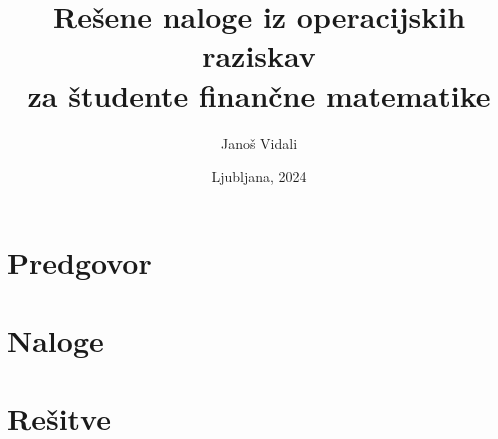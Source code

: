 \documentclass[a4paper, 11pt, titlepage, twoside]{article}
\begin{document}
\title{Rešene naloge iz operacijskih raziskav \\
{\Large za študente finančne matematike}}
\author{\Large Janoš Vidali}
\date{\vfill Ljubljana, 2024}
\maketitle

\cleardoublepage

\setcounter{tocdepth}{2}
\tableofcontents

\cleardoublepage

\section*{Predgovor}

{



}

\cleardoublepage



\section{Naloge}
{


}

\cleardoublepage

\section{Rešitve}
{


}

\cleardoublepage



\end{document}
